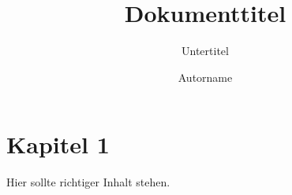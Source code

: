 \documentclass[ngerman]{scrartcl}
\title[Kurzform]{Dokumenttitel} %
\subtitle{Untertitel} %
\author{Autorname} %
\begin{document}
 \maketitle

 \tableofcontents
 \cleardoublepage

 \section{Kapitel 1}
 \label{sec:kap1}

 Hier sollte richtiger Inhalt stehen.
\end{document}
